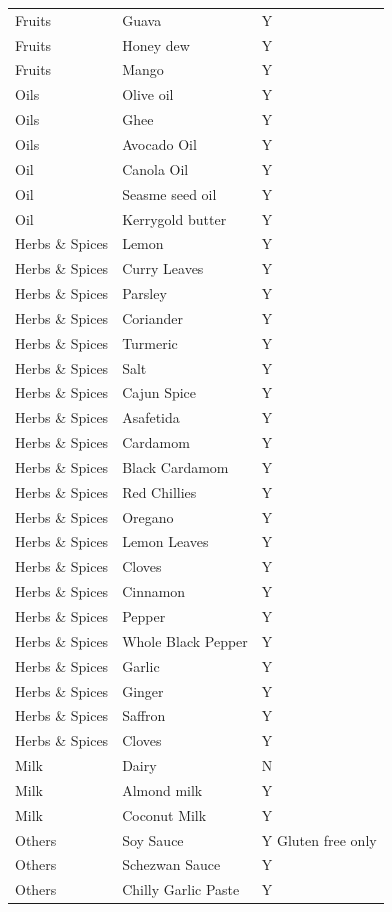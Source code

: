 \documentclass[
  oneside]{book}
\begin{document}
\begin{longtable}[t]{lll}
\addlinespace
Fruits & Guava & Y\\
Fruits & Honey dew & Y\\
Fruits & Mango & Y\\
Oils & Olive oil & Y\\
Oils & Ghee & Y\\
\addlinespace
Oils & Avocado Oil & Y\\
Oil & Canola Oil & Y\\
Oil & Seasme seed oil & Y\\
Oil & Kerrygold butter & Y\\
Herbs \& Spices & Lemon & Y\\
\addlinespace
Herbs \& Spices & Curry Leaves & Y\\
Herbs \& Spices & Parsley & Y\\
Herbs \& Spices & Coriander & Y\\
Herbs \& Spices & Turmeric & Y\\
Herbs \& Spices & Salt & Y\\
\addlinespace
Herbs \& Spices & Cajun Spice & Y\\
Herbs \& Spices & Asafetida & Y\\
Herbs \& Spices & Cardamom & Y\\
Herbs \& Spices & Black Cardamom & Y\\
Herbs \& Spices & Red Chillies & Y\\
\addlinespace
Herbs \& Spices & Oregano & Y\\
Herbs \& Spices & Lemon Leaves & Y\\
Herbs \& Spices & Cloves & Y\\
Herbs \& Spices & Cinnamon & Y\\
Herbs \& Spices & Pepper & Y\\
\addlinespace
Herbs \& Spices & Whole Black Pepper & Y\\
Herbs \& Spices & Garlic & Y\\
Herbs \& Spices & Ginger & Y\\
Herbs \& Spices & Saffron & Y\\
Herbs \& Spices & Cloves & Y\\
\addlinespace
Milk & Dairy & N\\
Milk & Almond milk & Y\\
Milk & Coconut Milk & Y\\
Others & Soy Sauce & Y
Gluten free only\\
Others & Schezwan Sauce & Y\\
\addlinespace
Others & Chilly Garlic Paste & Y\\

\end{longtable}
\end{document}
